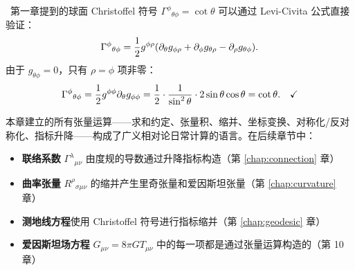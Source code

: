\
第一章提到的球面 Christoffel 符号 $\Gamma^\phi{}_{\theta\phi} = \cot\theta$ 可以通过 Levi-Civita 公式直接验证：
\begin{equation}
    \Gamma^\phi{}_{\theta\phi} = \frac{1}{2} g^{\phi\rho} (\partial_\theta g_{\phi\rho} + \partial_\phi g_{\theta\rho} - \partial_\rho g_{\theta\phi}).
\end{equation}
由于 $g_{\theta\phi} = 0$，只有 $\rho = \phi$ 项非零：
\begin{equation}
    \Gamma^\phi{}_{\theta\phi} = \frac{1}{2} g^{\phi\phi} \partial_\theta g_{\phi\phi} = \frac{1}{2} \cdot \frac{1}{\sin^2\theta} \cdot 2\sin\theta\cos\theta = \cot\theta. \quad \checkmark
\end{equation}


\begin{note}
本章建立的所有张量运算——求和约定、张量积、缩并、坐标变换、对称化/反对称化、指标升降——构成了广义相对论日常计算的语言。在后续章节中：
\begin{itemize}
    \item \textbf{联络系数} $\Gamma^\lambda{}_{\mu\nu}$ 由度规的导数通过升降指标构造（第 \ref{chap:connection} 章）
    \item \textbf{曲率张量} $R^\rho{}_{\sigma\mu\nu}$ 的缩并产生里奇张量和爱因斯坦张量（第 \ref{chap:curvature} 章）
    \item \textbf{测地线方程}使用 Christoffel 符号进行指标缩并（第 \ref{chap:geodesic} 章）
    \item \textbf{爱因斯坦场方程} $G_{\mu\nu} = 8\pi G T_{\mu\nu}$ 中的每一项都是通过张量运算构造的（第 10 章）
\end{itemize}
\end{note}

